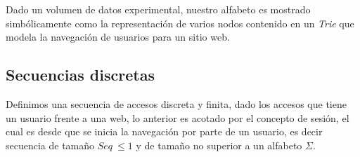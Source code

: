 Dado un volumen de datos experimental, nuestro alfabeto es mostrado simbólicamente como la representación de varios nodos contenido en un \emph{Trie} que modela la navegación de usuarios para un sitio web.





\subsection{Secuencias discretas}\label{concept-discret-seq}

Definimos una secuencia de accesos discreta y finita, dado los accesos que tiene un usuario frente a una web, lo anterior es acotado por el concepto de sesión, el cual es desde que se inicia la navegación por parte de un usuario, es decir secuencia de tamaño $Seq\ \leq 1$ y de tamaño no superior a un alfabeto $\Sigma$.



